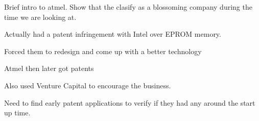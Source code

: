 
{}


Brief intro to atmel.
Show that the clasify as a blossoming company during the time we are looking at.

Actually had a patent infringement with Intel over EPROM memory. 

Forced them to redesign and come up with a better technology

Atmel then later got patents

Also used Venture Capital to encourage the business.


Need to find early patent applications to verify if they had any around the start up time.


